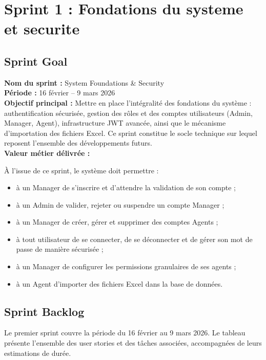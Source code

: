 \documentclass[a4paper,12pt]{report}
\begin{document}
 
\section{Sprint 1 : Fondations du systeme et securite}
 
\subsection{Sprint Goal}
 
\textbf{Nom du sprint :} System Foundations \& Security \\
\textbf{Période :} 16 février -- 9 mars 2026 \\[4pt]
\textbf{Objectif principal :}
Mettre en place l'intégralité des fondations du système : authentification
sécurisée, gestion des rôles et des comptes utilisateurs (Admin, Manager,
Agent), infrastructure JWT avancée, ainsi que le mécanisme d'importation
des fichiers Excel. Ce sprint constitue le socle technique sur lequel
reposent l'ensemble des développements futurs. \\[4pt]
\textbf{Valeur métier délivrée :}
 
À l'issue de ce sprint, le système doit permettre :
\begin{itemize}
    \item à un Manager de s'inscrire et d'attendre la validation de son
    compte ;
    \item à un Admin de valider, rejeter ou suspendre un compte Manager ;
    \item à un Manager de créer, gérer et supprimer des comptes Agents ;
    \item à tout utilisateur de se connecter, de se déconnecter et de gérer
    son mot de passe de manière sécurisée ;
    \item à un Manager de configurer les permissions granulaires de ses
    agents ;
    \item à un Agent d'importer des fichiers Excel dans la base de données.
\end{itemize}
 
\subsection{Sprint Backlog}
 
Le premier sprint couvre la période du 16 février au 9 mars 2026. Le
tableau présente l'ensemble des user stories et
des tâches associées, accompagnées de leurs estimations de durée.
 
\end{document}
